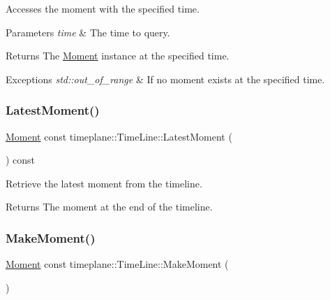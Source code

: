 Accesses the moment with the specified time. 


\begin{DoxyParams}{Parameters}
{\em time} & The time to query. \\
\hline
\end{DoxyParams}
\begin{DoxyReturn}{Returns}
The {\ttfamily \hyperlink{classtimeplane_1_1_moment}{Moment}} instance at the specified time. 
\end{DoxyReturn}

\begin{DoxyExceptions}{Exceptions}
{\em std\+::out\+\_\+of\+\_\+range} & If no moment exists at the specified time. \\
\hline
\end{DoxyExceptions}
\mbox{\label{classtimeplane_1_1_time_line_acc391553e5c45a647c82f27e53ae3af8}} 
\subsubsection{\texorpdfstring{Latest\+Moment()}{LatestMoment()}}
{\footnotesize\ttfamily \hyperlink{classtimeplane_1_1_moment}{Moment} const timeplane\+::\+Time\+Line\+::\+Latest\+Moment (\begin{DoxyParamCaption}{ }\end{DoxyParamCaption}) const\hspace{0.3cm}{\ttfamily [noexcept]}}



Retrieve the latest moment from the timeline. 

\begin{DoxyReturn}{Returns}
The moment at the end of the timeline. 
\end{DoxyReturn}
\mbox{\label{classtimeplane_1_1_time_line_a7520362a8b33962371b1a47831b37b03}} 
\subsubsection{\texorpdfstring{Make\+Moment()}{MakeMoment()}}
{\footnotesize\ttfamily \hyperlink{classtimeplane_1_1_moment}{Moment} const timeplane\+::\+Time\+Line\+::\+Make\+Moment (\begin{DoxyParamCaption}{ }\end{DoxyParamCaption})}



